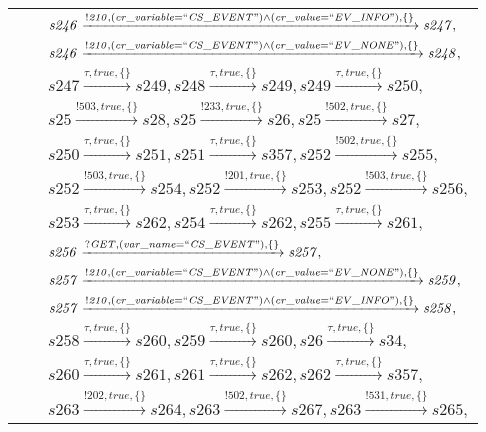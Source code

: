 \begin{tabular}{lcl}
& & $\mathit{s246}\xrightarrow{\mathit{!210}, \mathit{(cr\_variable = ``CS\_EVENT") \land (cr\_value = ``EV\_INFO")}, \{\}}\mathit{s247},$ \\
& & $\mathit{s246}\xrightarrow{\mathit{!210}, \mathit{(cr\_variable = ``CS\_EVENT") \land (cr\_value = ``EV\_NONE")}, \{\}}\mathit{s248},$ \\
& & $\mathit{s247}\xrightarrow{\mathit{\tau}, \mathit{true}, \{\}}\mathit{s249},\mathit{s248}\xrightarrow{\mathit{\tau}, \mathit{true}, \{\}}\mathit{s249},\mathit{s249}\xrightarrow{\mathit{\tau}, \mathit{true}, \{\}}\mathit{s250},$ \\
& & $\mathit{s25}\xrightarrow{\mathit{!503}, \mathit{true}, \{\}}\mathit{s28},\mathit{s25}\xrightarrow{\mathit{!233}, \mathit{true}, \{\}}\mathit{s26},\mathit{s25}\xrightarrow{\mathit{!502}, \mathit{true}, \{\}}\mathit{s27},$ \\
& & $\mathit{s250}\xrightarrow{\mathit{\tau}, \mathit{true}, \{\}}\mathit{s251},\mathit{s251}\xrightarrow{\mathit{\tau}, \mathit{true}, \{\}}\mathit{s357},\mathit{s252}\xrightarrow{\mathit{!502}, \mathit{true}, \{\}}\mathit{s255},$ \\
& & $\mathit{s252}\xrightarrow{\mathit{!503}, \mathit{true}, \{\}}\mathit{s254},\mathit{s252}\xrightarrow{\mathit{!201}, \mathit{true}, \{\}}\mathit{s253},\mathit{s252}\xrightarrow{\mathit{!503}, \mathit{true}, \{\}}\mathit{s256},$ \\
& & $\mathit{s253}\xrightarrow{\mathit{\tau}, \mathit{true}, \{\}}\mathit{s262},\mathit{s254}\xrightarrow{\mathit{\tau}, \mathit{true}, \{\}}\mathit{s262},\mathit{s255}\xrightarrow{\mathit{\tau}, \mathit{true}, \{\}}\mathit{s261},$ \\
& & $\mathit{s256}\xrightarrow{\mathit{?GET}, \mathit{(var\_name = ``CS\_EVENT")}, \{\}}\mathit{s257},$ \\
& & $\mathit{s257}\xrightarrow{\mathit{!210}, \mathit{(cr\_variable = ``CS\_EVENT") \land (cr\_value = ``EV\_NONE")}, \{\}}\mathit{s259},$ \\
& & $\mathit{s257}\xrightarrow{\mathit{!210}, \mathit{(cr\_variable = ``CS\_EVENT") \land (cr\_value = ``EV\_INFO")}, \{\}}\mathit{s258},$ \\
& & $\mathit{s258}\xrightarrow{\mathit{\tau}, \mathit{true}, \{\}}\mathit{s260},\mathit{s259}\xrightarrow{\mathit{\tau}, \mathit{true}, \{\}}\mathit{s260},\mathit{s26}\xrightarrow{\mathit{\tau}, \mathit{true}, \{\}}\mathit{s34},$ \\
& & $\mathit{s260}\xrightarrow{\mathit{\tau}, \mathit{true}, \{\}}\mathit{s261},\mathit{s261}\xrightarrow{\mathit{\tau}, \mathit{true}, \{\}}\mathit{s262},\mathit{s262}\xrightarrow{\mathit{\tau}, \mathit{true}, \{\}}\mathit{s357},$ \\
& & $\mathit{s263}\xrightarrow{\mathit{!202}, \mathit{true}, \{\}}\mathit{s264},\mathit{s263}\xrightarrow{\mathit{!502}, \mathit{true}, \{\}}\mathit{s267},\mathit{s263}\xrightarrow{\mathit{!531}, \mathit{true}, \{\}}\mathit{s265},$ \\
\end{tabular}

